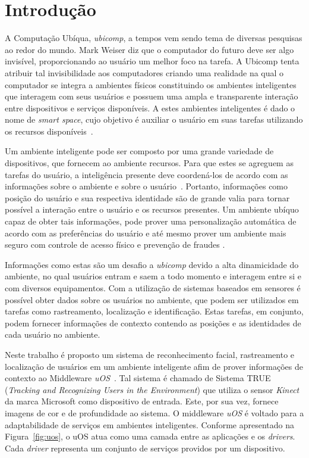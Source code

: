 \chapter{Introdução}

	
A Computação Ubíqua, \textit{ubicomp}, a tempos vem sendo tema de diversas
pesquisas ao redor do mundo. Mark Weiser diz que o computador do futuro deve ser
algo invisível, proporcionando ao usuário um melhor foco na tarefa. A Ubicomp
tenta atribuir tal invisibilidade aos computadores criando uma realidade na qual
o computador se integra a ambientes físicos constituindo os ambientes
inteligentes que interagem com seus usuários e possuem uma ampla e transparente
interação entre dispositivos e serviços disponíveis. A estes ambientes
inteligentes é dado o nome de \textit{smart space}, cujo objetivo é auxiliar o
usuário em suas tarefas utilizando os recursos
disponíveis~\cite{fabriciobuzzeto,alegomes,weiser1, weiser2}.
	
Um ambiente inteligente pode ser composto por uma grande variedade de
dispositivos, que fornecem ao ambiente recursos. Para que estes se agreguem as
tarefas do usuário, a inteligência presente deve coordená-los de acordo com as
informações sobre o ambiente e sobre o usuário~\cite{fabriciobuzzeto}. Portanto,
informações como posição do usuário e sua respectiva identidade são de grande
valia para tornar possível a interação entre o usuário e os recursos presentes.
Um ambiente ubíquo capaz de obter tais informações, pode prover uma
personalização automática de acordo com as preferências do usuário e até mesmo
prover um ambiente mais seguro com controle de acesso físico e prevenção de
fraudes \cite{saocarlos}.
	
Informações como estas são um desafio a \textit{ubicomp} devido a alta
dinamicidade do ambiente, no qual usuários entram e saem a todo momento e interagem entre si e
com diversos equipamentos. Com a utilização de sistemas baseados em sensores é
possível obter dados sobre os usuários no ambiente, que podem ser utilizados em
tarefas como rastreamento, localização e identificação. Estas tarefas, em
conjunto, podem fornecer informações de contexto contendo as posições e as
identidades de cada usuário no ambiente.
	
Neste trabalho é proposto um sistema de reconhecimento facial, rastreamento e
localização de usuários em um ambiente inteligente afim de prover informações de
contexto ao Middleware \textit{uOS}~\cite{fabriciobuzzeto}. Tal sistema é chamado de Sistema TRUE
(\textit{Tracking and Recognizing Users in the Environment}) que utiliza o
sensor \textit{Kinect} da marca Microsoft como dispositivo de entrada. Este, por
sua vez, fornece imagens de cor e de profundidade ao sistema. O middleware \textit{uOS} é voltado para a adaptabilidade de serviços em ambientes inteligentes. Conforme apresentado na Figura~\ref{fig:uos}, o uOS atua como uma camada entre as aplicações e os \textit{drivers}. Cada \textit{driver} representa um conjunto de serviços providos por um dispositivo.

